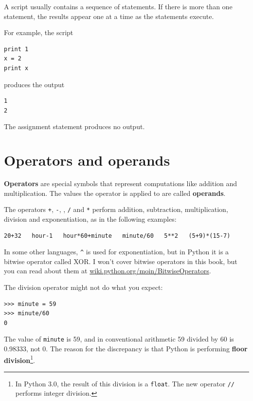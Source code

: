 \documentclass[10pt]{book}
\begin{document}
A script usually contains a sequence of statements.  If there
is more than one statement, the results appear one at a time
as the statements execute.

For example, the script

\beforeverb
\begin{verbatim}
print 1
x = 2
print x
\end{verbatim}
\afterverb
%
produces the output

\beforeverb
\begin{verbatim}
1
2
\end{verbatim}
\afterverb
%
The assignment statement produces no output.


\section{Operators and operands}

{\bf Operators} are special symbols that represent computations like
addition and multiplication.  The values the operator is applied to
are called {\bf operands}.

The operators {\tt +}, {\tt -}, {\tt *}, {\tt /} and {\tt **}
perform addition, subtraction, multiplication, division and
exponentiation, as in the following examples:

\beforeverb
\begin{verbatim}
20+32   hour-1   hour*60+minute   minute/60   5**2   (5+9)*(15-7)
\end{verbatim}
\afterverb
%
In some other languages, \verb"^" is used for exponentiation, but
in Python it is a bitwise operator called XOR.  I won't cover
bitwise operators in this book, but you can read about
them at \url{wiki.python.org/moin/BitwiseOperators}.



The division operator might not do what you expect:

\beforeverb
\begin{verbatim}
>>> minute = 59
>>> minute/60
0
\end{verbatim}
\afterverb
%
The value of {\tt minute} is 59, and in conventional arithmetic 59
divided by 60 is 0.98333, not 0.  The reason for the discrepancy is
that Python is performing {\bf floor division}\footnote{In Python 3.0,
the result of this division is a {\tt float}.  The new operator
{\tt //} performs integer division.}.
\end{document}
